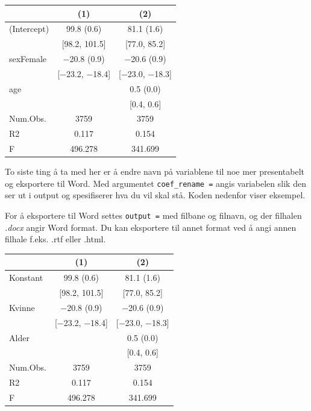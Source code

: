 \documentclass[
  letterpaper,
  DIV=11,
  numbers=noendperiod]{scrreprt}
\theoremstyle{definition}
\theoremstyle{remark}
\begin{document}
\begin{table}
\centering
\begin{tabular}[t]{lcc}
\toprule
  & (1) & (2)\\
\midrule
(Intercept) & \num{99.8} (\num{0.6}) & \num{81.1} (\num{1.6})\\
 & {}[\num{98.2}, \num{101.5}] & {}[\num{77.0}, \num{85.2}]\\
sexFemale & \num{-20.8} (\num{0.9}) & \num{-20.6} (\num{0.9})\\
 & {}[\num{-23.2}, \num{-18.4}] & {}[\num{-23.0}, \num{-18.3}]\\
age &  & \num{0.5} (\num{0.0})\\
 &  & {}[\num{0.4}, \num{0.6}]\\
\midrule
Num.Obs. & \num{3759} & \num{3759}\\
R2 & \num{0.117} & \num{0.154}\\
F & \num{496.278} & \num{341.699}\\
\bottomrule
\end{tabular}
\end{table}

To siste ting å ta med her er å endre navn på variablene til noe mer
presentabelt og eksportere til Word. Med argumentet
\texttt{coef\_rename\ =} angis variabelen slik den ser ut i output og
spesifiserer hva du vil skal stå. Koden nedenfor viser eksempel.

For å eksportere til Word settes \texttt{output\ =} med filbane og
filnavn, og der filhalen \emph{.docx} angir Word format. Du kan
eksportere til annet format ved å angi annen filhale f.eks. .rtf eller
.html.

\begin{table}
\centering
\begin{tabular}[t]{lcc}
\toprule
  & (1) & (2)\\
\midrule
Konstant & \num{99.8} (\num{0.6}) & \num{81.1} (\num{1.6})\\
 & {}[\num{98.2}, \num{101.5}] & {}[\num{77.0}, \num{85.2}]\\
Kvinne & \num{-20.8} (\num{0.9}) & \num{-20.6} (\num{0.9})\\
 & {}[\num{-23.2}, \num{-18.4}] & {}[\num{-23.0}, \num{-18.3}]\\
Alder &  & \num{0.5} (\num{0.0})\\
 &  & {}[\num{0.4}, \num{0.6}]\\
\midrule
Num.Obs. & \num{3759} & \num{3759}\\
R2 & \num{0.117} & \num{0.154}\\
F & \num{496.278} & \num{341.699}\\
\bottomrule
\end{tabular}
\end{table}
\end{document}
